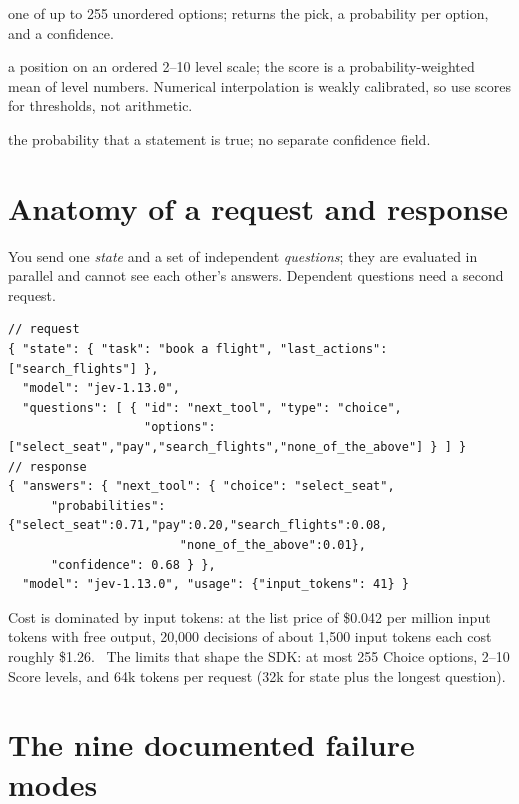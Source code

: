 \begin{description}[leftmargin=1.4cm,style=nextline]
  \item[Choice] one of up to 255 unordered options; returns the pick, a probability per
    option, and a confidence.\DOC{}
  \item[Score] a position on an ordered 2--10 level scale; the score is a
    probability-weighted mean of level numbers. Numerical interpolation is weakly
    calibrated, so use scores for thresholds, not arithmetic.\DOC{}
  \item[Noul] the probability that a statement is true; no separate confidence field.\DOC{}
\end{description}

\section{Anatomy of a request and response}

You send one \emph{state} and a set of independent \emph{questions}; they are evaluated in
parallel and cannot see each other's answers.\DOC{} Dependent questions need a second
request.

\begin{lstlisting}[language=jsonc,caption={A Choice request and its response (schematic).},label={lst:jevreq}]
// request
{ "state": { "task": "book a flight", "last_actions": ["search_flights"] },
  "model": "jev-1.13.0",
  "questions": [ { "id": "next_tool", "type": "choice",
                   "options": ["select_seat","pay","search_flights","none_of_the_above"] } ] }
// response
{ "answers": { "next_tool": { "choice": "select_seat",
      "probabilities": {"select_seat":0.71,"pay":0.20,"search_flights":0.08,
                        "none_of_the_above":0.01},
      "confidence": 0.68 } },
  "model": "jev-1.13.0", "usage": {"input_tokens": 41} }
\end{lstlisting}

\begin{worked}
Cost is dominated by input tokens: at the list price of \$0.042 per million input tokens
with free output, 20{,}000 decisions of about 1{,}500 input tokens each cost roughly
\$1.26.\DOC{}~\citep{typesafe_models} The limits that shape the SDK: at most 255 Choice
options, 2--10 Score levels, and 64k tokens per request (32k for state plus the longest
question).\DOC{}
\end{worked}

\section{The nine documented failure modes}

